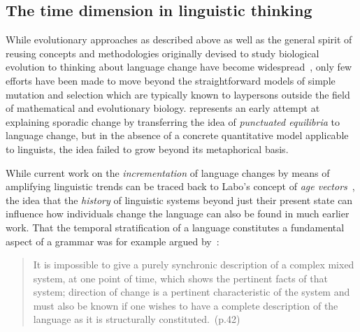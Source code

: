 \subsection{The time dimension in linguistic thinking}

While evolutionary approaches as described above as well as the general spirit of reusing concepts and methodologies originally devised to study biological evolution to thinking about language change have become widespread~\citep{Atkinson2005}, only few efforts have been made to move beyond the straightforward models of simple mutation and selection which are typically known to laypersons outside the field of mathematical and evolutionary biology.
\citet{Dixon1997} represents an early attempt at explaining sporadic change by transferring the idea of \emph{punctuated equilibria} to language change, but in the absence of a concrete quantitative model applicable to linguists, the idea failed to grow beyond its metaphorical basis.

While current work on the \emph{incrementation} of language changes by means of amplifying linguistic trends can be traced back to Labo's concept of \emph{age vectors}~\citep[ch.14 in particular]{Labov2001}, the idea that the \emph{history} of linguistic systems beyond just their present state can influence how individuals change the language can also be found in much earlier work. %
That the temporal stratification of a language constitutes a fundamental aspect of a grammar was for example argued by~\citet{Fries1949}:

\begin{quote}
It is impossible to give a purely synchronic description of a complex mixed system, at one point of time, which shows the pertinent facts of that system; direction of change is a pertinent characteristic of the system and must also be known if one wishes to have a complete description of the language as it is structurally constituted.~(p.42)
\end{quote}

